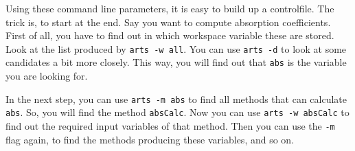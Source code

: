 Using these command line parameters, it is easy to build up a
controlfile. The trick is, to start at the end. Say you want to
compute absorption coefficients. First of all, you have to find out
in which workspace variable these are stored. Look at the list
produced by \verb|arts -w all|. You can use \verb|arts -d| to look at
some candidates a bit more closely. This way, you will find out that
\verb|abs| is the variable you are looking for.

In the next step, you can use \verb|arts -m abs| to find all methods
that can calculate \verb|abs|. So, you will find the method
\verb|absCalc|. Now you can use \verb|arts -w absCalc| to find out the
required input variables of that method. Then you can use the
\verb|-m| flag again, to find the methods producing these variables,
and so on.

